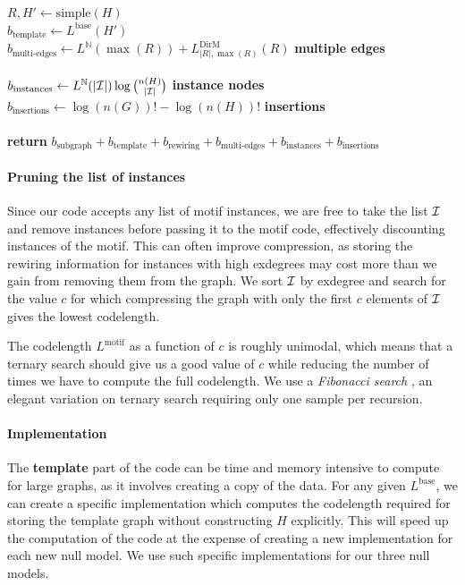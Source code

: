 \documentclass[twoside,11pt]{article}
\newcommand{\N}{{\mathbb N}}
\begin{document}
\begin{pseudo}[th]
{$R, H' \leftarrow \text{simple}(H)$ \\
$b_\text{template} \leftarrow L^\text{base}(H')$\\ 
$b_\text{multi-edges} \leftarrow L^\N(\max(R)) + L^\text{DirM}_{|R|, \max(R)}(R)$ \hfill \textbf{multiple edges}\\
\\
$b_\text{instances} \leftarrow L^\N (|{\cal I}|) \log {n(H) \choose |{\cal I}|}$ \hfill \textbf{instance nodes}\\
$b_\text{insertions} \leftarrow \log (n(G))! - \log (n(H))!$ \hfill \textbf{insertions}\\    
\\
\textbf{return} $b_\text{subgraph} + b_\text{template} + b_\text{rewiring} + b_\text{multi-edges} + b_\text{instances} + b_\text{insertions}$\\
}
\end{pseudo} 

\paragraph{Pruning the list of instances} Since our code accepts any list of motif instances, we are free to take the list $\cal I$ and remove instances before passing it to the motif code, effectively discounting instances of the motif. This can often improve compression, as storing the rewiring information for instances with high exdegrees may cost more than we gain from removing them from the graph. We sort  $\cal I$ by exdegree and search for the value $c$ for which compressing the graph with only the first $c$ elements of $\cal I$ gives the lowest codelength.

The codelength $L^\text{motif}$ as a function of $c$ is roughly unimodal, which means that a ternary search should give us a good value of $c$ while reducing the number of times we have to compute the full codelength. We use a \emph{Fibonacci search} \citep{kiefer1953sequential}, an elegant variation on ternary search requiring only one sample per recursion.

\paragraph{Implementation} The \textbf{template} part of the code can be time and memory intensive to compute for large graphs, as it involves creating a copy of the data. For any given $L^\text{base}$, we can create a specific implementation which computes the codelength required for storing the template graph without constructing $H$ explicitly. This will speed up the computation of the code at the expense of creating a new implementation for each new null model. We use such specific implementations for our three null models.
\end{document}
